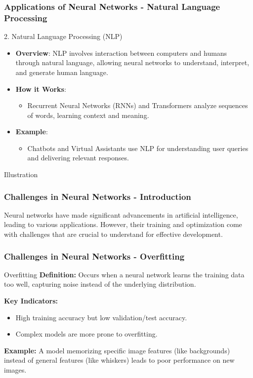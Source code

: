 \documentclass{beamer}
\begin{document}
\begin{frame}[fragile]
    \frametitle{Applications of Neural Networks - Natural Language Processing}
    \begin{block}{2. Natural Language Processing (NLP)}
        \begin{itemize}
            \item \textbf{Overview}: NLP involves interaction between computers and humans through natural language, allowing neural networks to understand, interpret, and generate human language.
            \item \textbf{How it Works}:
            \begin{itemize}
                \item Recurrent Neural Networks (RNNs) and Transformers analyze sequences of words, learning context and meaning.
            \end{itemize}
            \item \textbf{Example}:
            \begin{itemize}
                \item Chatbots and Virtual Assistants use NLP for understanding user queries and delivering relevant responses.
            \end{itemize}
        \end{itemize}
    \end{block}

    \begin{block}{Illustration}
    \end{block}
\end{frame}

\begin{frame}[fragile]
    \frametitle{Challenges in Neural Networks - Introduction}
    Neural networks have made significant advancements in artificial intelligence, leading to various applications. However, their training and optimization come with challenges that are crucial to understand for effective development.
\end{frame}

\begin{frame}[fragile]
    \frametitle{Challenges in Neural Networks - Overfitting}
    \begin{block}{Overfitting}
        \textbf{Definition:} Occurs when a neural network learns the training data too well, capturing noise instead of the underlying distribution.
        
        \textbf{Key Indicators:}
        \begin{itemize}
            \item High training accuracy but low validation/test accuracy.
            \item Complex models are more prone to overfitting.
        \end{itemize}
        
        \textbf{Example:} 
        A model memorizing specific image features (like backgrounds) instead of general features (like whiskers) leads to poor performance on new images.
    \end{block}
\end{frame}
\end{document}
